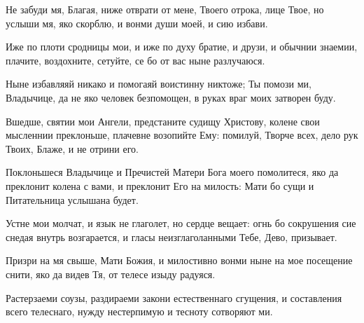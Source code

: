 \begin{mymulticols}



Не забуди мя, Благая, ниже отврати от мене, Твоего отрока, лице Твое, но услыши мя, яко скорблю, и вонми души моей, и сию избави.


Иже по плоти сродницы мои, и иже по духу братие, и друзи, и обычнии знаемии, плачите, воздохните, сетуйте, се бо от вас ныне разлучаюся.


Ныне избавляяй никако и помогаяй воистинну никтоже; Ты помози ми, Владычице, да не яко человек безпомощен, в руках враг моих затворен буду.

\slava

Вшедше, святии мои Ангели, предстаните судищу Христову, колене свои мысленнии преклоньше, плачевне возопийте Ему: помилуй, Творче всех, дело рук Твоих, Блаже, и не отрини его.

\inyne

 Поклоньшеся Владычице и Пречистей Матери Бога моего помолитеся, яко да преклонит колена с вами, и преклонит Его на милость: Мати бо сущи и Питательница услышана будет.




Устне мои молчат, и язык не глаголет, но сердце вещает: огнь бо сокрушения сие снедая внутрь возгарается, и гласы неизглаголанными Тебе, Дево, призывает.


Призри на мя свыше, Мати Божия, и милостивно вонми ныне на мое посещение снити, яко да видев Тя, от телесе изыду радуяся.


Растерзаеми соузы, раздираеми закони естественнаго сгущения, и составления всего телеснаго, нужду нестерпимую и тесноту сотворяют ми.

\slava


\end{mymulticols}
